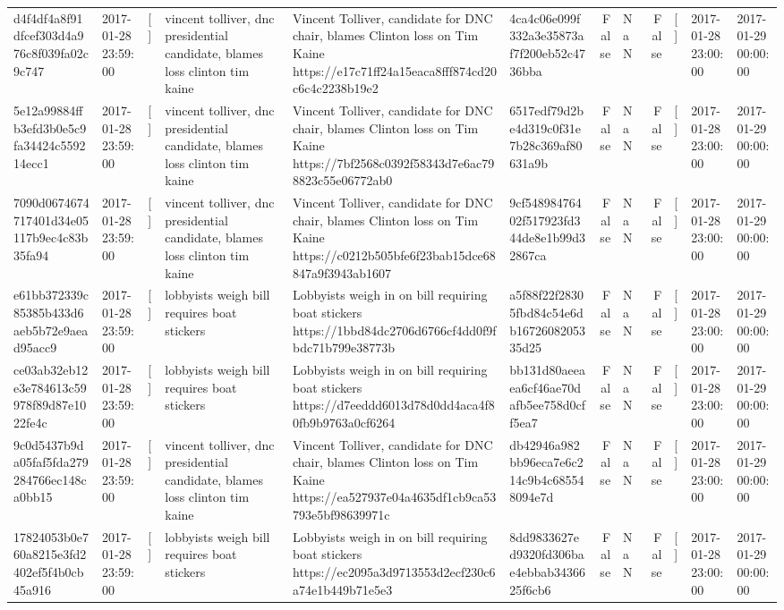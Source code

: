 \begin{tabular}{llllllrlrlll}
d4f4df4a8f91dfcef303d4a976c8f039fa02c9c747 & 2017-01-28 23:59:00 & [] & vincent tolliver, dnc presidential candidate, blames loss clinton tim kaine & Vincent Tolliver, candidate for DNC chair, blames Clinton loss on Tim Kaine https://e17c71ff24a15eaca8fff874cd20c6c4c2238b19e2 & 4ca4c06e099f332a3e35873af7f200eb52c4736bba & False & NaN & False & [] & 2017-01-28 23:00:00 & 2017-01-29 00:00:00 \\
5e12a99884ffb3efd3b0e5c9fa34424c559214ecc1 & 2017-01-28 23:59:00 & [] & vincent tolliver, dnc presidential candidate, blames loss clinton tim kaine & Vincent Tolliver, candidate for DNC chair, blames Clinton loss on Tim Kaine https://7bf2568c0392f58343d7e6ac798823c55e06772ab0 & 6517edf79d2be4d319c0f31e7b28c369af80631a9b & False & NaN & False & [] & 2017-01-28 23:00:00 & 2017-01-29 00:00:00 \\
7090d0674674717401d34e05117b9ec4c83b35fa94 & 2017-01-28 23:59:00 & [] & vincent tolliver, dnc presidential candidate, blames loss clinton tim kaine & Vincent Tolliver, candidate for DNC chair, blames Clinton loss on Tim Kaine https://c0212b505bfe6f23bab15dce68847a9f3943ab1607 & 9cf54898476402f517923fd344de8e1b99d32867ca & False & NaN & False & [] & 2017-01-28 23:00:00 & 2017-01-29 00:00:00 \\
e61bb372339c85385b433d6aeb5b72e9aead95acc9 & 2017-01-28 23:59:00 & [] & lobbyists weigh bill requires boat stickers & Lobbyists weigh in on bill requiring boat stickers https://1bbd84dc2706d6766cf4dd0f9fbdc71b799e38773b & a5f88f22f28305fbd84c54e6db1672608205335d25 & False & NaN & False & [] & 2017-01-28 23:00:00 & 2017-01-29 00:00:00 \\
ce03ab32eb12e3e784613c59978f89d87e1022fe4c & 2017-01-28 23:59:00 & [] & lobbyists weigh bill requires boat stickers & Lobbyists weigh in on bill requiring boat stickers https://d7eeddd6013d78d0dd4aca4f80fb9b9763a0cf6264 & bb131d80aeeaea6cf46ae70dafb5ee758d0cff5ea7 & False & NaN & False & [] & 2017-01-28 23:00:00 & 2017-01-29 00:00:00 \\
9c0d5437b9da05faf5fda279284766ec148ca0bb15 & 2017-01-28 23:59:00 & [] & vincent tolliver, dnc presidential candidate, blames loss clinton tim kaine & Vincent Tolliver, candidate for DNC chair, blames Clinton loss on Tim Kaine https://ea527937e04a4635df1cb9ca53793e5bf98639971c & db42946a982bb96eca7e6c214c9b4c685548094e7d & False & NaN & False & [] & 2017-01-28 23:00:00 & 2017-01-29 00:00:00 \\
17824053b0e760a8215e3fd2402ef5f4b0cb45a916 & 2017-01-28 23:59:00 & [] & lobbyists weigh bill requires boat stickers & Lobbyists weigh in on bill requiring boat stickers https://ec2095a3d9713553d2ecf230c6a74e1b449b71e5e3 & 8dd9833627ed9320fd306bae4ebbab3436625f6cb6 & False & NaN & False & [] & 2017-01-28 23:00:00 & 2017-01-29 00:00:00 \\

\end{tabular}
